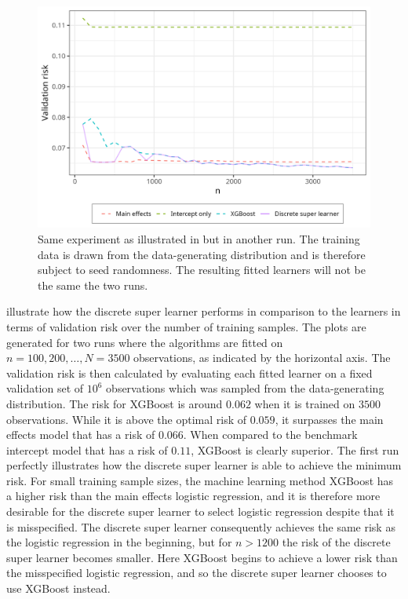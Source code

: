 \documentclass[./main.tex]{subfiles}
\begin{document}
\begin{figure}[H]
    \centering
    \includegraphics[width=\textwidth]{figures/dsl_loss_jumps.png}
    \caption{Same experiment as illustrated in  but in another run. The training data is drawn from the data-generating distribution and is therefore subject to seed randomness. The resulting fitted learners will not be the same the two runs.}
    \label{fig:loss_jumps}
\end{figure}
 illustrate how the discrete super learner performs in comparison to the learners in terms of validation risk over the number of training samples. The plots are generated for two runs where the algorithms are fitted on $ n = 100, 200, \dots , N = 3500 $ observations, as indicated by the horizontal axis. The validation risk is then calculated by evaluating each fitted learner on a fixed validation set of $ 10^{6} $ observations which was sampled from the data-generating distribution.  
The risk for XGBoost is around $ 0.062 $ when it is trained on $ 3500 $ observations. While it is above the optimal risk of $ 0.059 $, it surpasses the main effects model that has a risk of $ 0.066 $. When compared to the benchmark intercept model that has a risk of $ 0.11 $, XGBoost is clearly superior. 
The first run perfectly illustrates how the discrete super learner is able to achieve the minimum risk. For small training sample sizes, the machine learning method XGBoost has a higher risk than the main effects logistic regression, and it is therefore more desirable for the discrete super learner to select logistic regression despite that it is misspecified. The discrete super learner consequently achieves the same risk as the logistic regression in the beginning, but for $ n > 1200 $ the risk of the discrete super learner becomes smaller. Here XGBoost begins to achieve a lower risk than the misspecified logistic regression, and so the discrete super learner chooses to use XGBoost instead. 
\end{document}
